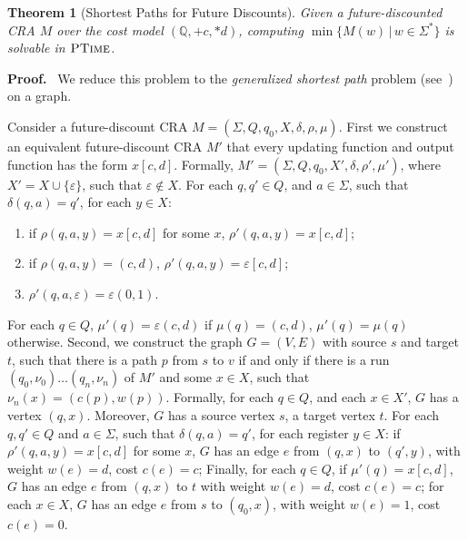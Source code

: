 \documentclass[11pt]{article}
\newtheorem{theorem}{Theorem}
\def\Proof{{\bf Proof.}}
\newcommand{\Rat}{\ensuremath{\mathbb{Q}}}
\newcommand{\sep}{\ensuremath{\,|\,}}
\newcommand{\inputalph}{\ensuremath{\Sigma}}
\newcommand{\state}{\ensuremath{q}}
\newcommand{\fm}[1]{\ensuremath{#1^{*}}}
\newcommand{\valuation}{\ensuremath{\nu}}
\newcommand{\ptime}{\ensuremath{\sc\textsc{PTime}}\xspace}
\newcommand{\edwa}{\ensuremath{M}}
\newcommand{\edwastates}{\ensuremath{Q}}
\newcommand{\edwastate}{\ensuremath{q}}
\newcommand{\edwainitst}{\ensuremath{\edwastate_0}}
\newcommand{\edwavariables}{\ensuremath{X}}
\newcommand{\edwatrans}{\ensuremath{\delta}}
\newcommand{\edwavarup}{\ensuremath{\rho}}
\newcommand{\edwafinal}{\ensuremath{\mu}}
\begin{document}
\begin{theorem}[Shortest Paths for Future Discounts]
Given a future-discounted CRA $\edwa$ over the cost model
$(\Rat,+c,*d)$, computing $\min\{\edwa(w)\sep w\in\fm\Sigma\}$ is
solvable in $\ptime$.
\end{theorem}
\Proof~
We reduce this problem to the {\em generalized shortest path\/} problem
(see~\cite{batagelj_generalized_2000,oldham_combinatorial_1999}) on a graph.

Consider a future-discount CRA $\edwa = (\inputalph, \edwastates, \edwainitst, \edwavariables, \edwatrans, \edwavarup, \edwafinal)$.
First we construct an equivalent future-discount CRA $\edwa' $ that every updating function and output function has the form $x[c,d]$. Formally,
$\edwa' = (\inputalph, \edwastates, \edwainitst, \edwavariables', \edwatrans, \edwavarup', \edwafinal')$, where
 $\edwavariables' = \edwavariables \cup \{\varepsilon\}$, such that $\varepsilon \not \in \edwavariables$. For each $\state,\state'\in \edwastates$,
 and $a\in \inputalph$, such that $\edwatrans(\state,a)=\state'$, for each $y\in \edwavariables$:
\begin{enumerate}
\item if $\edwavarup(\state,a,y)=x[c,d]$ for some $x$, $\edwavarup'(\state,a,y)=x[c,d]$;
\item if $\edwavarup(\state,a,y)=(c,d)$, $\edwavarup'(\state,a,y)=\varepsilon[c,d]$;
\item $\edwavarup'(\state,a,\varepsilon)=\varepsilon(0,1)$.
\end{enumerate}
For each $\state \in \edwastates$, $\edwafinal'(\state)=\varepsilon(c,d)$ if $\edwafinal(\state)=(c,d)$,
$\edwafinal'(\state)=\edwafinal(\state)$ otherwise.
Second, we construct the graph $G=(V,E)$ with source $s$ and target $t$, such that there is a path $p$ from $s$ to $v$ if and only if
there is a run $(\edwastate_0,\valuation_0)\ldots
(\edwastate_n,\valuation_n)$ of $\edwa'$ and some $x\in \edwavariables$, such that $\valuation_n(x)=(c(p),w(p))$.
Formally, for each $\state \in \edwastates$, and each $x \in \edwavariables'$, $G$ has a vertex $(\state,x)$.
Moreover, $G$ has a source vertex $s$, a target vertex $t$. For each
$\state,\state'\in \edwastates$ and $a\in \inputalph$, such that
$\edwatrans(\state,a)=\state'$,  for each register $y\in \edwavariables$:
if $\edwavarup'(\state,a,y)=x[c,d]$ for some $x$, $G$ has an
edge $e$ from $(\state,x)$ to $(\state',y)$, with weight $w(e)=d$, cost $c(e)=c$;
Finally,
for each $\state\in \edwastates$, if $\edwafinal'(\state)=x[c,d]$, $G$ has
an edge $e$ from $(\state,x)$ to $t$ with weight $w(e)=d$, cost $c(e)=c$;
for each $x\in \edwavariables$, $G$ has an edge $e$ from $s$ to $(\edwainitst,x)$, with weight $w(e)=1$, cost $c(e)=0$.
\end{document}
